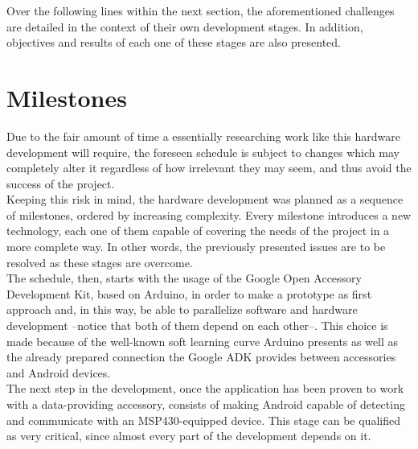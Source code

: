 	Over the following lines within the next section, the aforementioned challenges are detailed
	in the context of their own development stages. In addition, objectives and results of each one of
	these stages are also presented.
	
	\section{Milestones}	
	
	Due to the fair amount of time a essentially researching work like this hardware development will
	require, the foreseen schedule is subject to changes which may completely alter it regardless of 
	how irrelevant they may seem, and thus avoid the success of the project.\\
	
	Keeping this risk in mind, the hardware development was planned as a sequence of milestones,
	ordered by increasing complexity. Every milestone introduces a new technology, each one of them
	capable of covering the needs of the project in a more complete way. In other words, the previously
	presented issues are to be resolved as these stages are overcome.\\
	
	The schedule, then, starts with the usage of the Google Open Accessory Development Kit, based on Arduino,
	in order to make a prototype as first approach and, in this way, be able to parallelize software and
	hardware development --notice that both of them depend on each other--. This choice is made because of
	the well-known soft learning curve Arduino presents as well as the already prepared connection
	the Google ADK provides between accessories and Android devices.\\
	
	The next step in the development, once the application has been proven to work with a data-providing
	accessory, consists of making Android capable of detecting and communicate with an MSP430-equipped
	device. This stage can be qualified as very critical, since almost every part of the development
	depends on it.\\
	
